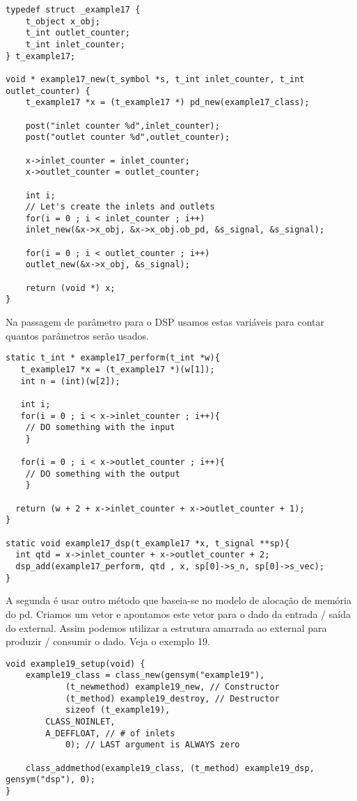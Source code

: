 \begin{lstlisting}
typedef struct _example17 {
    t_object x_obj;
    t_int outlet_counter;
    t_int inlet_counter;
} t_example17;

void * example17_new(t_symbol *s, t_int inlet_counter, t_int outlet_counter) {
    t_example17 *x = (t_example17 *) pd_new(example17_class);

    post("inlet counter %d",inlet_counter);
    post("outlet counter %d",outlet_counter);

    x->inlet_counter = inlet_counter;
    x->outlet_counter = outlet_counter;

    int i;
    // Let's create the inlets and outlets
    for(i = 0 ; i < inlet_counter ; i++)
	inlet_new(&x->x_obj, &x->x_obj.ob_pd, &s_signal, &s_signal);

    for(i = 0 ; i < outlet_counter ; i++)
	outlet_new(&x->x_obj, &s_signal);

    return (void *) x;
}
\end{lstlisting}

Na passagem de parâmetro para o DSP usamos estas variáveis para contar quantos parâmetros serão usados.

\begin{lstlisting}
static t_int * example17_perform(t_int *w){
   t_example17 *x = (t_example17 *)(w[1]);
   int n = (int)(w[2]);

   int i;
   for(i = 0 ; i < x->inlet_counter ; i++){
	// DO something with the input
	}

   for(i = 0 ; i < x->outlet_counter ; i++){
	// DO something with the output
	}

  return (w + 2 + x->inlet_counter + x->outlet_counter + 1);
}

static void example17_dsp(t_example17 *x, t_signal **sp){
  int qtd = x->inlet_counter + x->outlet_counter + 2;
  dsp_add(example17_perform, qtd , x, sp[0]->s_n, sp[0]->s_vec);
}
\end{lstlisting}


A segunda é usar outro método que baseia-se no modelo de alocação de memória do pd. Criamos um vetor e 
apontamos este vetor para o dado da entrada / saída do external. Assim podemos utilizar a estrutura
amarrada ao external para produzir / consumir o dado. Veja o exemplo 19.

\begin{lstlisting}
void example19_setup(void) {
    example19_class = class_new(gensym("example19"),
            (t_newmethod) example19_new, // Constructor
            (t_method) example19_destroy, // Destructor
            sizeof (t_example19),
	    CLASS_NOINLET,
	    A_DEFFLOAT, // # of inlets
            0); // LAST argument is ALWAYS zero

    class_addmethod(example19_class, (t_method) example19_dsp, gensym("dsp"), 0);
}
\end{lstlisting}

